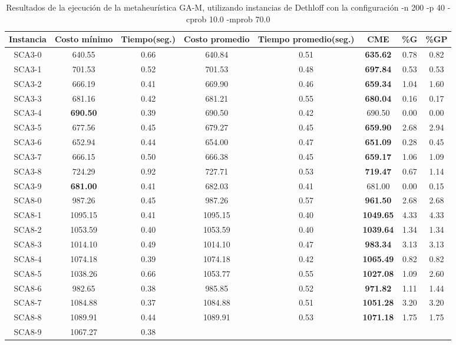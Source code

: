 \begin{table}[ht]
\caption{Resultados de la ejecución de la metaheurística GA-M, utilizando instancias de Dethloff con la configuración -n 200 -p 40 -cprob 10.0 -mprob 70.0}
\centering
\small
\begin{tabular}{c c c c c c c c}
\hline\hline
Instancia & Costo mínimo & Tiempo(seg.) & Costo promedio & Tiempo promedio(seg.) & CME & \%G & \%GP \\ [0.5ex]
\hline
SCA3-0 & 640.55 & 0.66 & 
640.84 & 0.51 & \bf{635.62} & 
0.78 & 0.82\\SCA3-1 & 701.53 & 0.52 & 
701.53 & 0.48 & \bf{697.84} & 
0.53 & 0.53\\SCA3-2 & 666.19 & 0.41 & 
669.90 & 0.46 & \bf{659.34} & 
1.04 & 1.60\\SCA3-3 & 681.16 & 0.42 & 
681.21 & 0.55 & \bf{680.04} & 
0.16 & 0.17\\SCA3-4 & \bf{690.50} & 0.39 & 
690.50 & 0.42 & 690.50 & 0.00
 & 0.00\\
SCA3-5 & 677.56 & 0.45 & 
679.27 & 0.45 & \bf{659.90} & 
2.68 & 2.94\\SCA3-6 & 652.94 & 0.44 & 
654.00 & 0.47 & \bf{651.09} & 
0.28 & 0.45\\SCA3-7 & 666.15 & 0.50 & 
666.38 & 0.45 & \bf{659.17} & 
1.06 & 1.09\\SCA3-8 & 724.29 & 0.92 & 
727.71 & 0.53 & \bf{719.47} & 
0.67 & 1.14\\SCA3-9 & \bf{681.00} & 0.41 & 
682.03 & 0.41 & 681.00 & 0.00
 & 0.15\\SCA8-0 & 987.26 & 0.45 & 
987.26 & 0.57 & \bf{961.50} & 
2.68 & 2.68\\SCA8-1 & 1095.15 & 0.41 & 
1095.15 & 0.40 & \bf{1049.65} & 
4.33 & 4.33\\SCA8-2 & 1053.59 & 0.40 & 
1053.59 & 0.40 & \bf{1039.64} & 
1.34 & 1.34\\SCA8-3 & 1014.10 & 0.49 & 
1014.10 & 0.47 & \bf{983.34} & 
3.13 & 3.13\\SCA8-4 & 1074.18 & 0.39 & 
1074.18 & 0.42 & \bf{1065.49} & 
0.82 & 0.82\\SCA8-5 & 1038.26 & 0.66 & 
1053.77 & 0.55 & \bf{1027.08} & 
1.09 & 2.60\\SCA8-6 & 982.65 & 0.38 & 
985.85 & 0.52 & \bf{971.82} & 
1.11 & 1.44\\SCA8-7 & 1084.88 & 0.37 & 
1084.88 & 0.51 & \bf{1051.28} & 
3.20 & 3.20\\SCA8-8 & 1089.91 & 0.44 & 
1089.91 & 0.53 & \bf{1071.18} & 
1.75 & 1.75\\SCA8-9 & 1067.27 & 0.38 & 

\end{tabular}
\end{table}
